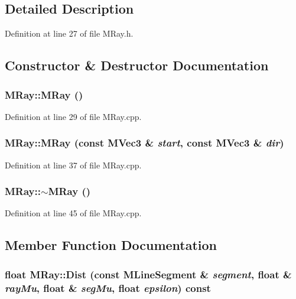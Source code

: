 \subsection{Detailed Description}


Definition at line 27 of file MRay.h.

\subsection{Constructor \& Destructor Documentation}
\hypertarget{class_m_ray_5babd699f32d3d26c009a23fb7a16079}{
\subsubsection[{MRay}]{\setlength{\rightskip}{0pt plus 5cm}MRay::MRay ()}}
\label{class_m_ray_5babd699f32d3d26c009a23fb7a16079}




Definition at line 29 of file MRay.cpp.\hypertarget{class_m_ray_c9fb26538c0007be7fc62fda53519653}{
\subsubsection[{MRay}]{\setlength{\rightskip}{0pt plus 5cm}MRay::MRay (const {\bf MVec3} \& {\em start}, \/  const {\bf MVec3} \& {\em dir})}}
\label{class_m_ray_c9fb26538c0007be7fc62fda53519653}




Definition at line 37 of file MRay.cpp.\hypertarget{class_m_ray_23fc1bdfd8238df1124a73f541dd4563}{
\subsubsection[{$\sim$MRay}]{\setlength{\rightskip}{0pt plus 5cm}MRay::$\sim$MRay ()}}
\label{class_m_ray_23fc1bdfd8238df1124a73f541dd4563}




Definition at line 45 of file MRay.cpp.

\subsection{Member Function Documentation}
\hypertarget{class_m_ray_1500542719a23ff8e159e20c0e4cd350}{
\subsubsection[{Dist}]{\setlength{\rightskip}{0pt plus 5cm}float MRay::Dist (const {\bf MLineSegment} \& {\em segment}, \/  float \& {\em rayMu}, \/  float \& {\em segMu}, \/  float {\em epsilon}) const}}
\label{class_m_ray_1500542719a23ff8e159e20c0e4cd350}





